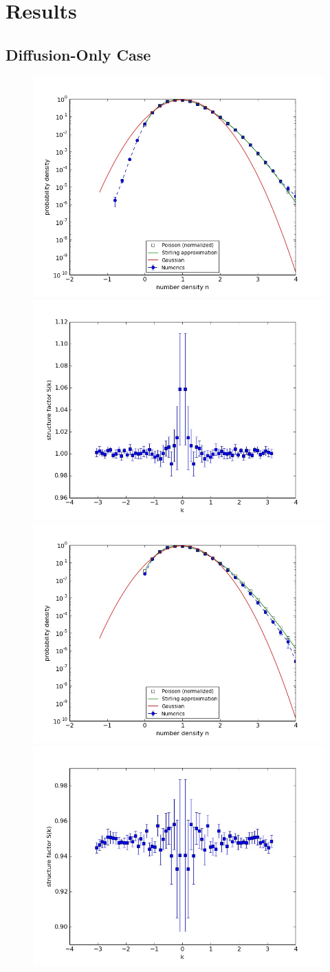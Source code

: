 \documentclass{article}
\begin{document}
\section{Results}

\subsection{Diffusion-Only Case}

\begin{figure}[ht!]
\includegraphics[width=0.5\linewidth]{fig1/diff_hist_avg1.jpg}
\includegraphics[width=0.5\linewidth]{fig1/diff_Sk_avg1.jpg}
\includegraphics[width=0.5\linewidth]{fig1/diff_hist_avg2.jpg}
\includegraphics[width=0.5\linewidth]{fig1/diff_Sk_avg2.jpg}

\end{figure}
\end{document}
